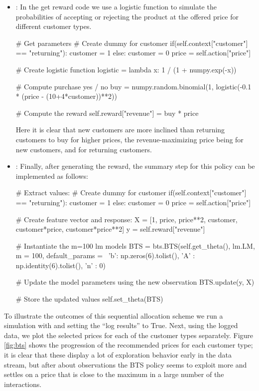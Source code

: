 \documentclass[nojss]{jss}
\begin{document}
\begin{itemize}
\item {}: In the get reward code we use a logistic function to simulate the probabilities of accepting or rejecting the product at the offered price for different customer types.
\begin{Code}
# Get parameters
# Create dummy for customer
if(self.context["customer"] == "returning"):
    customer = 1
else:
    customer = 0
price = self.action["price"]

# Create logistic function
logistic = lambda x: 1 / (1 + numpy.exp(-x))

# Compute purchase yes / no
buy = numpy.random.binomial(1, logistic(-0.1 * (price - (10+4*customer))**2))

# Compute the reward
self.reward["revenue"] = buy * price
\end{Code}
Here it is clear that new customers are more inclined than returning customers to buy for higher prices, the revenue-maximizing price being  for new customers, and  for returning customers.

\item {}: Finally, after generating the reward, the summary step for this policy can be implemented as follows:
\begin{Code}
# Extract values:
# Create dummy for customer
if(self.context["customer"] == "returning"):
    customer = 1
else:
    customer = 0
price = self.action["price"]

# Create feature vector and response:
X = [1, price, price**2, customer, customer*price, customer*price**2]
y = self.reward["revenue"]

# Instantiate the m=100 lm models
BTS = bts.BTS(self.get_theta(), lm.LM, m = 100, default_params = \
       {'b': np.zeros(6).tolist(), 'A' : np.identity(6).tolist(), 'n' : 0})

# Update the model parameters using the new observation
BTS.update(y, X)

# Store the updated values
self.set_theta(BTS)
\end{Code}
\end{itemize}

To illustrate the outcomes of this sequential allocation scheme we run a simulation with  and  setting the ``log results'' to True. Next, using the logged data, we plot the selected prices for each of the customer types separately. Figure \ref{fig:bts} shows the progression of the recommended prices for each customer type; it is clear that these display a lot of exploration behavior early in the data stream, but after about  observations the BTS policy seems to exploit more and settles on a price that is close to the maximum in a large number of the interactions.
\end{document}
